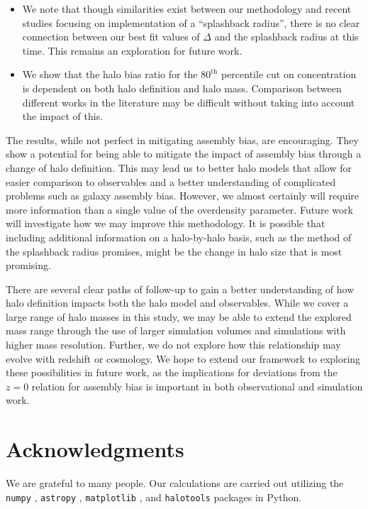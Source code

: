 \documentclass[usenatbib,fleqn]{mnras}
\begin{document}
\begin{itemize}
    \item We note that though similarities exist between our methodology and recent studies \citep{more_etal15} focusing on implementation of a ``splashback radius'', there is no clear connection between our best fit values of $\Delta$ and the splashback radius at this time. This remains an exploration for future work.
    \item We show that the halo bias ratio for the $80^{\mathrm{th}}$ percentile cut on concentration is dependent on both halo definition and halo mass. Comparison between different works in the literature may be difficult without taking into account the impact of this.
\end{itemize}

The results, while not perfect in mitigating assembly bias, are encouraging. They show a potential for being able to mitigate the impact of assembly bias through a change of halo definition. This may lead us to better halo models that allow for easier comparison to observables and a better understanding of complicated problems such as galaxy assembly bias. However, we almost certainly will require more information than a single value of the overdensity parameter. Future work will investigate how we may improve this methodology. It is possible that including additional information on a halo-by-halo basis, such as the method of the splashback radius promises, might be the change in halo size that is most promising.

There are several clear paths of follow-up to gain a better understanding of how halo definition impacts both the halo model and observables. While we cover a large range of halo masses in this study, we may be able to extend the explored mass range through the use of larger simulation volumes and simulations with higher mass resolution. Further, we do not explore how this relationship may evolve with redshift or cosmology. We hope to extend our framework to exploring these possibilities in future work, as the implications for deviations from the $z=0$ relation for assembly bias is important in both observational and simulation work.

\section*{Acknowledgments}

We are grateful to many people. Our calculations are carried out utilizing the
{\tt numpy} \citep{numpy}, {\tt astropy} \citep{astropy}, {\tt matplotlib} 
\citep{matplotlib}, and {\tt halotools} \citep{halotools} packages in Python.
\end{document}
